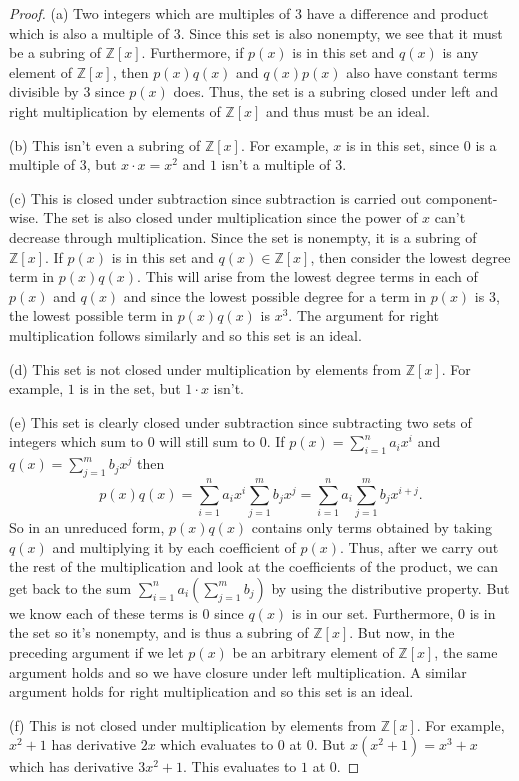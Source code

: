 \documentclass{article}
\begin{document}
\begin{proof}
(a) Two integers which are multiples of $3$ have a difference and product which is also a multiple of $3$. Since this set is also nonempty, we see that it must be a subring of $\mathbb{Z}[x]$. Furthermore, if $p(x)$ is in this set and $q(x)$ is any element of $\mathbb{Z}[x]$, then $p(x)q(x)$ and $q(x)p(x)$ also have constant terms divisible by $3$ since $p(x)$ does. Thus, the set is a subring closed under left and right multiplication by elements of $\mathbb{Z}[x]$ and thus must be an ideal.

(b) This isn't even a subring of $\mathbb{Z}[x]$. For example, $x$ is in this set, since $0$ is a multiple of $3$, but $x \cdot x = x^2$ and $1$ isn't a multiple of $3$.

(c) This is closed under subtraction since subtraction is carried out component-wise. The set is also closed under multiplication since the power of $x$ can't decrease through multiplication. Since the set is nonempty, it is a subring of $\mathbb{Z}[x]$. If $p(x)$ is in this set and $q(x) \in \mathbb{Z}[x]$, then consider the lowest degree term in $p(x)q(x)$. This will arise from the lowest degree terms in each of $p(x)$ and $q(x)$ and since the lowest possible degree for a term in $p(x)$ is $3$, the lowest possible term in $p(x)q(x)$ is $x^3$. The argument for right multiplication follows similarly and so this set is an ideal.

(d) This set is not closed under multiplication by elements from $\mathbb{Z}[x]$. For example, $1$ is in the set, but $1 \cdot x$ isn't.

(e) This set is clearly closed under subtraction since subtracting two sets of integers which sum to $0$ will still sum to $0$. If $p(x) = \sum_{i=1}^n a_ix^i$ and $q(x) = \sum_{j=1}^m b_jx^j$ then
\[
p(x)q(x) = \sum_{i=1}^n a_ix^i \sum_{j=1}^m b_jx^j = \sum_{i=1}^n a_i \sum_{j=1}^m b_jx^{i+j}.
\]
So in an unreduced form, $p(x)q(x)$ contains only terms obtained by taking $q(x)$ and multiplying it by each coefficient of $p(x)$. Thus, after we carry out the rest of the multiplication and look at the coefficients of the product, we can get back to the sum $\sum_{i=1}^n a_i \left (\sum_{j=1}^m b_j \right )$ by using the distributive property. But we know each of these terms is $0$ since $q(x)$ is in our set. Furthermore, $0$ is in the set so it's nonempty, and is thus a subring of $\mathbb{Z}[x]$. But now, in the preceding argument if we let $p(x)$ be an arbitrary element of $\mathbb{Z}[x]$, the same argument holds and so we have closure under left multiplication. A similar argument holds for right multiplication and so this set is an ideal.

(f) This is not closed under multiplication by elements from $\mathbb{Z}[x]$. For example, $x^2 + 1$ has derivative $2x$ which evaluates to $0$ at $0$. But $x(x^2 + 1) = x^3 + x$ which has derivative $3x^2 + 1$. This evaluates to $1$ at $0$.
\end{proof}
\end{document}
